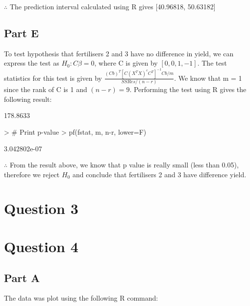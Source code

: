\documentclass{article}
\begin{document}
\noindent $\therefore$ The prediction interval calculated using R gives [40.96818, 50.63182]

\subsection{Part E}
To test hypothesis that fertilisers 2 and 3 have no difference in yield, we can express the test as $H_0: C\beta = 0$, where C is given by $[0, 0, 1, -1]$. The test statistics for this test is given by $\frac{(Cb)^T[C(X^TX)^cC^T]^{-1}Cb / m}{SSRes / (n - r)}$. We know that m = 1 since the rank of C is 1 and $(n-r) = 9$. Performing the test using R gives the following result:

\begin{Schunk}
\begin{Soutput}
         [,1]
[1,] 178.8633
\end{Soutput}
\begin{Sinput}
> # Print p-value
> pf(fstat, m, n-r, lower=F)
\end{Sinput}
\begin{Soutput}
             [,1]
[1,] 3.042802e-07
\end{Soutput}
\end{Schunk}

\noindent $\therefore$ From the result above, we know that p value is really small (less than 0.05), therefore we reject $H_0$ and conclude that fertilisers 2 and 3 have difference yield.

\newpage
\section{Question 3}

\newpage

\section{Question 4}
\subsection{Part A}
The data was plot using the following R command:
\end{document}
